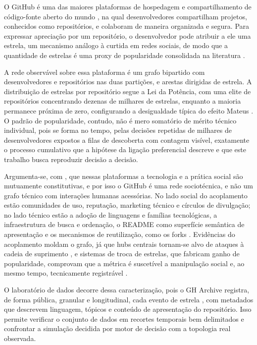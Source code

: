 \documentclass[12pt,oneside,a4paper,brazil,sumario=tradicional]{abntex2}
\begin{document}
O GitHub é uma das maiores plataformas de hospedagem e compartilhamento de código-fonte aberto do mundo \parencite{github2025, stackoverflow2025}, na qual desenvolvedores compartilham projetos, conhecidos como repositórios, e colaboram de maneira organizada e segura. Para expressar apreciação por um repositório, o desenvolvedor pode atribuir a ele uma estrela, um mecanismo análogo à curtida em redes sociais, de modo que a quantidade de estrelas é uma proxy de popularidade consolidada na literatura \parencite{borges2016, borges2018, gu2026}.

A rede observável sobre essa plataforma é um grafo bipartido com desenvolvedores e repositórios nas duas partições, e arestas dirigidas de estrela. A distribuição de estrelas por repositório segue a Lei da Potência, com uma elite de repositórios concentrando dezenas de milhares de estrelas, enquanto a maioria permanece próxima de zero, configurando a desigualdade típica do efeito Mateus \parencite{borges2018, gu2026, merton1968}. O padrão de popularidade, contudo, não é mero somatório de mérito técnico individual, pois se forma no tempo, pelas decisões repetidas de milhares de desenvolvedores expostos a filas de descoberta com contagem visível, exatamente o processo cumulativo que a hipótese da ligação preferencial descreve e que este trabalho busca reproduzir decisão a decisão.

Argumenta-se, com \textcite{orlikowski2008}, que nessas plataformas a tecnologia e a prática social são mutuamente constitutivas, e por isso o GitHub é uma rede sociotécnica, e não um grafo técnico com interações humanas acessórias. No lado social do acoplamento estão comunidades de uso, reputação, marketing técnico e círculos de divulgação; no lado técnico estão a adoção de linguagens e famílias tecnológicas, a infraestrutura de busca e ordenação, o README como superfície semântica de apresentação e os mecanismos de reutilização, como os forks \parencite{jiang2017}. Evidências do acoplamento moldam o grafo, já que hubs centrais tornam-se alvo de ataques à cadeia de suprimento \parencite{saayman2026, dholakia2026}, e sistemas de troca de estrelas, que fabricam ganho de popularidade, comprovam que a métrica é suscetível a manipulação social e, ao mesmo tempo, tecnicamente registrável \parencite{he2025b}.

O laboratório de dados decorre dessa caracterização, pois o GH Archive registra, de forma pública, granular e longitudinal, cada evento de estrela \parencite{grigorik_gharchive}, com metadados que descrevem linguagem, tópicos e conteúdo de apresentação do repositório. Isso permite verificar o conjunto de dados em recortes temporais bem delimitados e confrontar a simulação decidida por motor de decisão com a topologia real observada.
\end{document}
